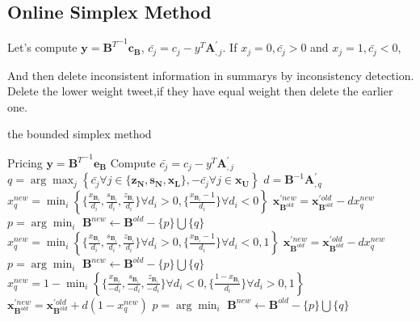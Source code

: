 \documentclass{llncs}
\begin{document}

\subsection{Online Simplex Method}
Let's compute $\mathbf{y} = {\mathbf{B}^T}^{-1}\mathbf{c_B}$, $\bar{c_j} = c_j - y^T\mathbf{A}_{,j}^{'}$. If $x_j = 0, \bar{c_j} > 0$ and $x_j = 1,\bar{c_j} < 0$, 

And then delete inconsistent information in summarys by inconsistency detection. Delete the lower weight tweet,if they have equal weight then delete the earlier one.


\begin{algorithm}
\caption{the bounded simplex method}

Pricing $\mathbf{y} = {\mathbf{B}^T}^{-1}\mathbf{e_B}$\;
Compute $\bar{c_j} = c_j - y^T\mathbf{A}_{,j}^{'}$\;
{
    $q = \arg\max_{j} \left\{\bar{c_j} \forall j\in\{\mathbf{z_N}, \mathbf{s_N}, \mathbf{x_L}  \},-\bar{c_j} \forall j\in\mathbf{x_U}  \right\}$\;
    $d = \mathbf{B}^{-1}\mathbf{A}_{,q}^{'}$\;
    {
        $x_q^{new} = \min_i \left\{\{\frac{x_{\mathbf{B}_{i}}}{d_i}, \frac{s_{\mathbf{B}_{i}}}{d_i}, \frac{z_{\mathbf{B}_{i}}}{d_i}\} \forall d_i>0,\{\frac{x_{\mathbf{B}_{i}}-1}{d_i}\} \forall d_i<0\right\}$\;
        $\mathbf{x}_{\mathbf{B}^{old}}^{'new} = \mathbf{x}_{\mathbf{B}^{old}}^{'old} - dx_q^{new}$\;
        $p=\arg\min_{i}$\;
        $\mathbf{B}^{new} \leftarrow \mathbf{B}^{old} - \{p\} \bigcup \{q\}$\;
    }
    {
        $x_q^{new} = \min_i \left\{\{\frac{x_{\mathbf{B}_{i}}}{d_i}, \frac{s_{\mathbf{B}_{i}}}{d_i}, \frac{z_{\mathbf{B}_{i}}}{d_i}\} \forall d_i>0, \{\frac{x_{\mathbf{B}_{i}}-1}{d_i}\} \forall d_i<0, 1 \right\}$\;
        $\mathbf{x}_{\mathbf{B}^{old}}^{'new} = \mathbf{x}_{\mathbf{B}^{old}}^{'old} - dx_q^{new}$\; 
        {
            $p=\arg\min_{i}$\;
            $\mathbf{B}^{new} \leftarrow \mathbf{B}^{old} - \{p\} \bigcup \{q\}$\;
        }
    }
    {
        $x_q^{new} = 1 - \min_i \left\{\{\frac{x_{\mathbf{B}_{i}}}{-d_i}, \frac{s_{\mathbf{B}_{i}}}{-d_i}, \frac{z_{\mathbf{B}_{i}}}{-d_i}\} \forall d_i<0, \{\frac{1-x_{\mathbf{B}_{i}}}{d_i}\} \forall d_i>0, 1 \right\}$\;
        $\mathbf{x}_{\mathbf{B}^{old}}^{'new} = \mathbf{x}_{\mathbf{B}^{old}}^{'old} + d(1-x_q^{new})$\;
        {
            $p=\arg\min_{i}$\;
            $\mathbf{B}^{new} \leftarrow \mathbf{B}^{old} - \{p\} \bigcup \{q\}$\;
        }
    }
}

\end{algorithm}
\end{document}

